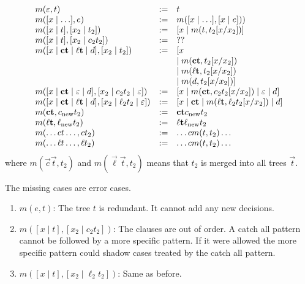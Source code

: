 $$
\begin{array}{lll}
    m(\varepsilon, t)
    &:=&
    t
    \\
    m([x \mid \ldots], e)
    &:=&
    m([x \mid \ldots], [x \mid e]))
    \\
    m([x \mid t], [x_2 \mid t_2])
    &:=&
    [x \mid m(t, t_2[x/x_2])]
    \\
    m([x \mid t], [x_2 \mid c_2 t_2 ])
    &:=&
    ??
    \\
    m([x \mid \vec c \vec t \mid \vec \ell \vec t \mid d], [x_2 \mid t_2])
    &:=&
    \begin{array}[t]{@{}l}
        [x
        \\
        \mid m(\vec c \vec t, t_2[x/x_2])
        \\
        \mid m(\vec \ell \vec t, t_2[x/x_2])
        \\
        \mid m(d, t_2[x/x_2])
        ]
    \end{array}
    \\
    m([x \mid \vec c \vec t \mid \varepsilon \mid d],
        [x_2 \mid c_2 t_2 \mid \varepsilon])
    &:=&
    [x \mid m(\vec c \vec t, c_2 t_2[x/x_2]) \mid \varepsilon \mid d]
    \\
    m([x \mid \vec c \vec t \mid \vec \ell \vec t \mid d],
        [x_2 \mid \ell_2 t_2 \mid \varepsilon])
    &:=&
    [x \mid \vec c \vec t \mid m(\vec \ell \vec t, \ell_2 t_2[x/x_2]) \mid d]
    \\
    m(\vec c \vec t, c_\text{new} t_2)
    &:=&
    \vec c \vec t c_{\text{new}} t_2
    \\
    m(\vec \vec \ell \vec t, \ell_\text{new} t_2)
    &:=&
    \vec \ell \vec t \ell_{\text{new}} t_2
    \\
    m(\ldots ct \ldots, c t_2)
    &:=&
    \ldots c m(t,t_2) \ldots
    \\
    m(\ldots \ell t \ldots, \ell t_2)
    &:=&
    \ldots c m(t,t_2) \ldots
\end{array}
$$
%
where $m(\vec c \vec t, t_2)$ and $m(\vec \ell \vec t, t_2)$ means that $t_2$ is
merged into all trees $\vec t$.

The missing cases are error cases.
%
\begin{enumerate}
    \item $m(e, t)$: The tree $t$ is redundant. It cannot add any new decisions.

    \item $m([x \mid t], [x_2 \mid c_2 t_2 ])$: The clauses are out of order. A
        catch all pattern cannot be followed by a more specific pattern. If it
        were allowed the more specific pattern could shadow cases treated by the
        catch all pattern.

    \item $m([x \mid t], [x_2 \mid \ell_2 t_2 ])$: Same as before.
\end{enumerate}


